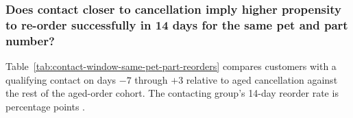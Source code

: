 \subsubsection{Does contact closer to cancellation imply higher propensity to re-order successfully in 14 days for the same pet and part number?}

Table~\ref{tab:contact-window-same-pet-part-reorders} compares customers with a
qualifying contact on days $-7$ through $+3$ relative to aged cancellation
against the rest of the aged-order cohort. The contacting group's 14-day reorder
rate is \ContactWindowRateDifference{} percentage points
\ContactWindowRateDirection.






\clearpage
\nolinenumbers


